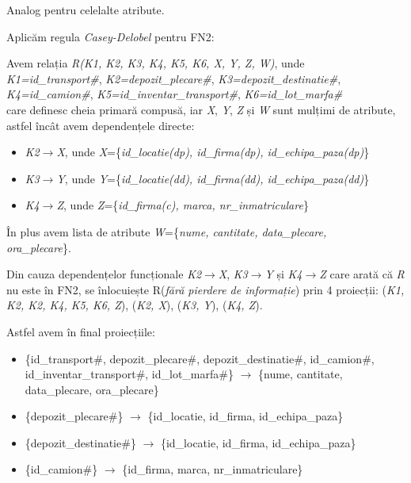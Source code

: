 \documentclass[12pt, a4paper]{article}
\begin{document}
Analog pentru celelalte atribute.

Aplicăm regula \emph{Casey-Delobel} pentru FN2:

Avem relația \emph{R(K1, K2, K3, K4, K5, K6, X, Y, Z, W)}, unde \\
\emph{K1=id\_transport\#}, \emph{K2=depozit\_plecare\#}, \emph{K3=depozit\_destinatie\#}, \\\emph{K4=id\_camion\#}, \emph{K5=id\_inventar\_transport\#}, \emph{K6=id\_lot\_marfa\#} \\care definesc cheia primară compusă, iar \emph{X}, \emph{Y}, \emph{Z} și \emph{W} sunt mulțimi de atribute, astfel încât avem dependențele directe: 
\begin{itemize}
    \item \emph{K2}$\rightarrow$\emph{X}, unde \emph{X}=\{\emph{id\_locatie(dp), id\_firma(dp), id\_echipa\_paza(dp)}\}
    \item \emph{K3}$\rightarrow$\emph{Y}, unde \emph{Y}=\{\emph{id\_locatie(dd), id\_firma(dd), id\_echipa\_paza(dd)}\}
    \item \emph{K4}$\rightarrow$\emph{Z}, unde \emph{Z}=\{\emph{id\_firma(c), marca, nr\_inmatriculare}\}
\end{itemize}

În plus avem lista de atribute \emph{W}=\{\emph{nume, cantitate, data\_plecare, \\ora\_plecare}\}.

Din cauza dependențelor funcționale \emph{K2}$\rightarrow$\emph{X}, \emph{K3}$\rightarrow$\emph{Y} și \emph{K4}$\rightarrow$\emph{Z} care arată că \emph{R} nu este în FN2, se înlocuiește R(\emph{fără pierdere de informație}) prin 4 proiecții:
(\emph{K1, K2, K2, K4, K5, K6, Z}), (\emph{K2, X}), (\emph{K3, Y}), (\emph{K4, Z}).

Astfel avem în final proiecțiile:

\begin{itemize}
    \item \{id\_transport\#, depozit\_plecare\#, depozit\_destinatie\#, id\_camion\#, id\_inventar\_transport\#, id\_lot\_marfa\#\} $\rightarrow$ \{nume, cantitate, \\data\_plecare, ora\_plecare\}
    \item \{depozit\_plecare\#\} $\rightarrow$ \{id\_locatie, id\_firma, id\_echipa\_paza\}
    \item \{depozit\_destinatie\#\} $\rightarrow$ \{id\_locatie, id\_firma, id\_echipa\_paza\}
    \item \{id\_camion\#\} $\rightarrow$ \{id\_firma, marca, nr\_inmatriculare\}
\end{itemize}
\end{document}
